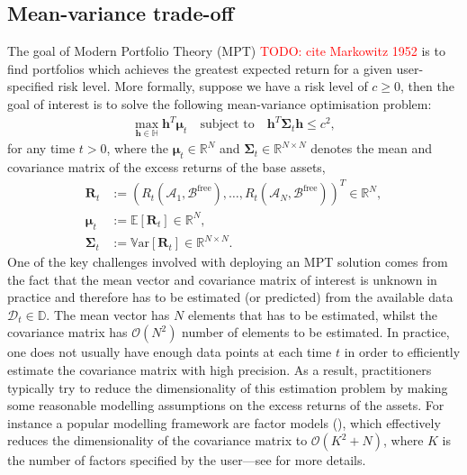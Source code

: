 \documentclass[12pt]{article}
\let\cref\crtcref
\begin{document}
\subsection{Mean-variance trade-off}
\label{sec:mean_variance}
The goal of Modern Portfolio Theory (MPT) \textcolor{red}{TODO: cite Markowitz 1952} is to find portfolios which achieves the greatest expected return for a given user-specified risk level. More formally, suppose we have a risk level of $c \geq 0$, then the goal of interest is to solve the following mean-variance optimisation problem:
\begin{align}
	\max_{\mathbf{h} \in \mathbb{H}} \mathbf{h}^T \boldsymbol{\mu}_t
	\quad
	\text{subject to}
	\quad 
	\mathbf{h}^T\boldsymbol{\Sigma}_t \mathbf{h} \leq c^2,
	\label{eqn:mean_variance_problem}
\end{align}
for any time $t > 0$, where the $\boldsymbol{\mu}_t \in \mathbb{R}^N$ and $\boldsymbol{\Sigma}_t \in \mathbb{R}^{N \times N}$ denotes the mean and covariance matrix of the excess returns of the base assets,
\begin{align}
	\mathbf{R}_t &:= (R_t(\mathcal{A}_1, \mathcal{B}^{\text{free}}), \dots, R_t(\mathcal{A}_N, \mathcal{B}^{\text{free}}))^T \in \mathbb{R}^N,
	\\
	\boldsymbol{\mu}_t &:= \mathbb{E}[\mathbf{R}_t] \in \mathbb{R}^N,
	\\
	\boldsymbol{\Sigma}_t &:= \mathbb{V}\text{ar}[\mathbf{R}_t] \in \mathbb{R}^{N \times N}.
\end{align}
One of the key challenges involved with deploying an MPT solution comes from the fact that the mean vector and covariance matrix of interest is unknown in practice and therefore has to be estimated (or predicted) from the available data $\mathcal{D}_t \in \mathbb{D}$. The mean vector has $N$ elements that has to be estimated, whilst the covariance matrix has $\mathcal{O}(N^2)$ number of elements to be estimated. In practice, one does not usually have enough data points at each time $t$ in order to efficiently estimate the covariance matrix with high precision. As a result, practitioners typically try to reduce the dimensionality of this estimation problem by making some reasonable modelling assumptions on the excess returns of the assets. For instance a popular modelling framework are factor models (\cref{sec:factor_models}), which effectively reduces the dimensionality of the covariance matrix to $\mathcal{O}(K^2 + N)$, where $K$ is the number of factors specified by the user---see \cref{sec:factor_models} for more details.
\end{document}

